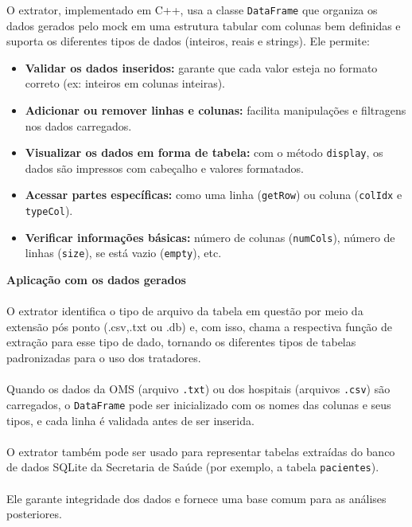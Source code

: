 \documentclass[a4paper,12pt]{article}
\begin{document}
O  extrator, implementado em C++, usa a classe \texttt{DataFrame} que organiza os dados gerados pelo mock em uma estrutura tabular com colunas bem definidas e suporta os diferentes tipos de dados (inteiros, reais e strings). Ele permite:

\begin{itemize}
    \item \textbf{Validar os dados inseridos:} garante que cada valor esteja no formato correto (ex: inteiros em colunas inteiras).
    
    \item \textbf{Adicionar ou remover linhas e colunas:} facilita manipulações e filtragens nos dados carregados.
    
    \item \textbf{Visualizar os dados em forma de tabela:} com o método \texttt{display}, os dados são impressos com cabeçalho e valores formatados.
    
    \item \textbf{Acessar partes específicas:} como uma linha (\texttt{getRow}) ou coluna (\texttt{colIdx} e \texttt{typeCol}).
    
    \item \textbf{Verificar informações básicas:} número de colunas (\texttt{numCols}), número de linhas (\texttt{size}), se está vazio (\texttt{empty}), etc.
\end{itemize}

\vspace{1em}

\textbf{Aplicação com os dados gerados}
\\
\\
O extrator identifica o tipo de arquivo da tabela em questão por meio da extensão pós ponto (.csv,.txt ou .db) e, com isso, chama a respectiva função de extração para esse tipo de dado, tornando os diferentes tipos de tabelas padronizadas para o uso dos tratadores.\\
\\
Quando os dados da OMS (arquivo \texttt{.txt}) ou dos hospitais (arquivos \texttt{.csv}) são carregados, o \texttt{DataFrame} pode ser inicializado com os nomes das colunas e seus tipos, e cada linha é validada antes de ser inserida.
\\
\\
O extrator também pode ser usado para representar tabelas extraídas do banco de dados SQLite da Secretaria de Saúde (por exemplo, a tabela \texttt{pacientes}).
\\
\\
Ele garante integridade dos dados e fornece uma base comum para as análises posteriores.
\end{document}
